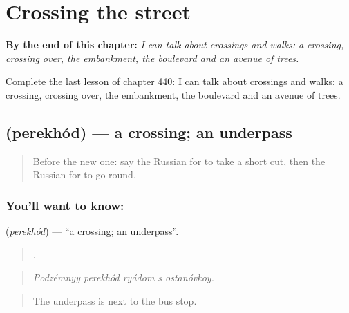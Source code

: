 
\chapter{Crossing the street}
\label{ch:ru-crossing-the-street}

\begin{chapteropening}
\textbf{By the end of this chapter:} \emph{I can talk about crossings and walks: a crossing, crossing over, the embankment, the boulevard and an avenue of trees.}

Complete the last lesson of chapter 440: I can talk about crossings and walks: a crossing, crossing over, the embankment, the boulevard and an avenue of trees.
\end{chapteropening}

\section[\texorpdfstring{\ru{переход} (perekhód)}{переход (perekhód)}]{ (perekhód) — a crossing; an underpass}

\label{lesson:RU-C440-perekhod}



\begin{quote}
Before the new one: say the Russian for to take a short cut, then the Russian for to go round.
\end{quote}

\subsection*{You'll want to know: }
\textbf{} (\emph{perekhód}) — \textquotedblleft{}a crossing; an underpass\textquotedblright{}.

\begin{quote}
    .
\end{quote}

\begin{quote}
\emph{Podzémnyy perekhód ryádom s ostanóvkoy.}
\end{quote}

\begin{quote}
The underpass is next to the bus stop.
\end{quote}

